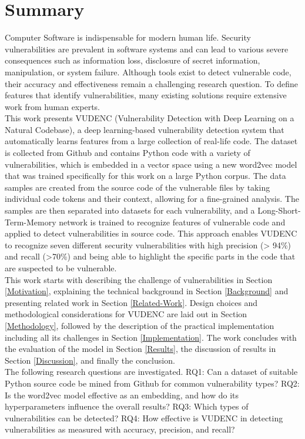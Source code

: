 \documentclass[
a4paper,
pagesize,
pdftex,
12pt,
twoside, %
BCOR=5mm, %
ngerman,
fleqn,
final,
]{scrartcl}
\begin{document}
	\section{Summary}
	Computer Software is indispensable for modern human life. Security vulnerabilities are prevalent in software systems and can lead to various severe consequences such as information loss, disclosure of secret information, manipulation, or system failure. Although tools exist to detect vulnerable code, their accuracy and effectiveness remain a challenging research question. To define features that identify vulnerabilities, many existing solutions require extensive work from human experts.\\ 
	This work presents VUDENC (Vulnerability Detection with Deep Learning on a Natural Codebase), a deep learning-based vulnerability detection system that automatically learns features from a large collection of real-life code. The dataset is collected from Github and contains Python code with a variety of vulnerabilities, which is embedded in a vector space using a new word2vec model that was trained specifically for this work on a large Python corpus. The data samples are created from the source code of the vulnerable files by taking individual code tokens and their context, allowing for a fine-grained analysis. The samples are then separated into datasets for each vulnerability, and a Long-Short-Term-Memory network is trained to recognize features of vulnerable code and applied to detect vulnerabilities in source code. This approach enables VUDENC to recognize seven different security vulnerabilities with high precision (> 94\%) and recall (>70\%) and being able to highlight the specific parts in the code that are suspected to be vulnerable.\\	
	This work starts with describing the challenge of vulnerabilities in Section \ref{Motivation}, explaining the technical background in Section \ref{Background} and presenting related work in Section \ref{Related-Work}. Design choices and methodological considerations for VUDENC are laid out in Section \ref{Methodology}, followed by the description of the practical implementation including all its challenges in Section \ref{Implementation}. The work concludes with the evaluation of the model in Section \ref{Results}, the discussion of results in Section \ref{Discussion}, and finally the conclusion.\\	
	The following research questions are investigated. RQ1: Can a dataset of suitable Python source code be mined from Github for common vulnerability types? RQ2: Is the word2vec model effective as an embedding, and how do its hyperparameters influence the overall results? RQ3: Which types of vulnerabilities can be detected? RQ4: How effective is VUDENC in detecting vulnerabilities as measured with accuracy, precision, and recall? \\
	
\end{document}
